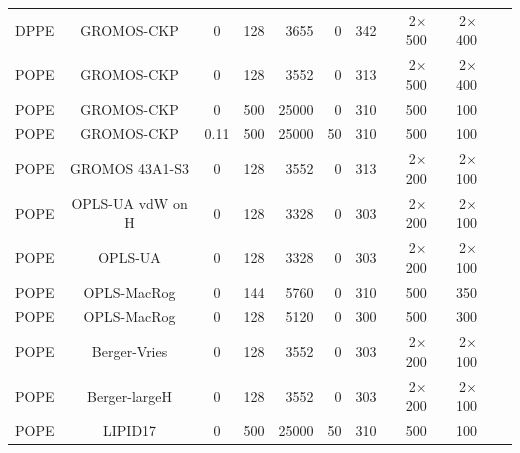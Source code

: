 \documentclass[journal=jpcbfk]{achemso}
\begin{document}
\begin{table}[htb]
\begin{minipage}[t]{\textwidth}
{\begin{tabular}{l c c r r r r r r c c}
      \hline
      DPPE  & GROMOS-CKP    \cite{??}      &0    & 128	& 3655  &0    & 342  & 2$\times$500 & 2$\times$400 & \cite{gromosCKPdppe} \\
      POPE  & GROMOS-CKP    \cite{??}      &0    & 128	& 3552  &0    & 313  & 2$\times$500 & 2$\times$400 & \cite{gromosCKPpope} \\
      POPE  & GROMOS-CKP    \cite{??}      &0    & 500	& 25000 &0    & 310  & 500 & 100 & \cite{gromosCKPpopeT310} \\
      POPE  & GROMOS-CKP    \cite{??}      &0.11 & 500	& 25000 &50   & 310  & 500 & 100 & \cite{gromosCKPpopeT310150mMNaCl} \\
      \hline
      POPE  & GROMOS 43A1-S3 \cite{??}     &0    & 128	& 3552     &0    & 313  & 2$\times$200 & 2$\times$100 & \cite{gromos43a1s3POPEfiles}  \\
      \hline
      POPE  & OPLS-UA vdW on H \cite{??}   &0    & 128	& 3328     &0    & 303  & 2$\times$200 & 2$\times$100 & \cite{OPLSuaWvdWPOPEfiles} \\
      POPE  & OPLS-UA \cite{??}            &0    & 128	& 3328     &0    & 303  & 2$\times$200 & 2$\times$100 & \cite{OPLSuaPOPEfiles} \\
      \hline
      POPE  & OPLS-MacRog \cite{rog16}     &0    & 144	& 5760     &0    & 310  & 500 & 350 & \cite{MacRogPOPEfiles} \\
      POPE  & OPLS-MacRog \cite{rog16}     &0    & 128	& 5120     &0    & 300  & 500 & 300 & \cite{MacRogPOPEfilesT300K} \\
      \hline
      POPE  & Berger-Vries \cite{??}       &0    & 128	& 3552  &0    & 303  & 2$\times$200 & 2$\times$100 & \cite{bergerPOPEfiles}  \\
      POPE  & Berger-largeH \cite{??}      &0    & 128	& 3552  &0    & 303  & 2$\times$200 & 2$\times$100 & \cite{berger2POPEfiles}  \\
      \hline
      POPE             & LIPID17 \cite{gould18} & 0      & 500 & 25000 & 50  &  310  & 500 & 100 & \cite{POPElipid17} \\

\end{tabular}}
\end{minipage}
\end{table}
\end{document}
